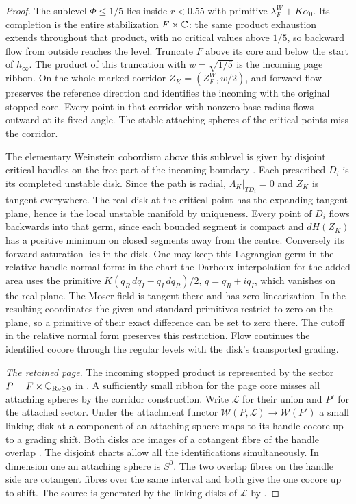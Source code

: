 \begin{proof}
The sublevel $\Phi\le1/5$ lies inside $r<0.55$ with primitive $\lambda_F^W+K\alpha_0$. Its completion is the entire stabilization $F\times\mathbb C$: the same product exhaustion extends throughout that product, with no critical values above $1/5$, so backward flow from outside reaches the level. Truncate $F$ above its core and below the start of $h_\infty$. The product of this truncation with $w=\sqrt{1/5}$ is the incoming page ribbon. On the whole marked corridor $Z_K=(Z_F^W,w/2)$, and forward flow preserves the reference direction and identifies the incoming with the original stopped core. Every point in that corridor with nonzero base radius flows outward at its fixed angle. The stable attaching spheres of the critical points miss the corridor.

The elementary Weinstein cobordism above this sublevel is given by disjoint critical handles on the free part of the incoming boundary \cite[\S6.3, Lemma~6.6]{GirPar}. Each prescribed $D_i$ is its completed unstable disk. Since the path is radial, $\Lambda_K|_{TD_i}=0$ and $Z_K$ is tangent everywhere. The real disk at the critical point has the expanding tangent plane, hence is the local unstable manifold by uniqueness. Every point of $D_i$ flows backwards into that germ, since each bounded segment is compact and $dH(Z_K)$ has a positive minimum on closed segments away from the centre. Conversely its forward saturation lies in the disk. One may keep this Lagrangian germ in the relative handle normal form: in the chart the Darboux interpolation for the added area uses the primitive $K(q_R\,dq_I-q_I\,dq_R)/2$, $q=q_R+iq_I$, which vanishes on the real plane. The Moser field is tangent there and has zero linearization. In the resulting coordinates the given and standard primitives restrict to zero on the plane, so a primitive of their exact difference can be set to zero there. The cutoff in the relative normal form preserves this restriction. Flow continues the identified cocore through the regular levels with the disk's transported grading.

\medskip
\noindent\emph{The retained page.}
The incoming stopped product is represented by the sector $P=F\times\mathbb C_{\operatorname{Re}\ge0}$ in \cite[(3.3)]{GPS}. A sufficiently small ribbon for the page core misses all attaching spheres by the corridor construction. Write $\mathcal L$ for their union and $P'$ for the attached sector. Under the attachment functor $\mathcal W(P,\mathcal L)\to\mathcal W(P')$ a small linking disk at a component of an attaching sphere maps to its handle cocore up to a grading shift. Both disks are images of a cotangent fibre of the handle overlap \cite[\S11.3]{GPS}. The disjoint charts allow all the identifications simultaneously. In dimension one an attaching sphere is $S^0$. The two overlap fibres on the handle side are cotangent fibres over the same interval and both give the one cocore up to shift. The source is generated by the linking disks of $\mathcal L$ by \cite[Theorem~1.16]{GPS}.


\end{proof}
